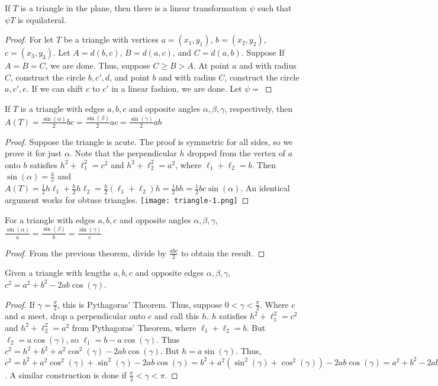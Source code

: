 \documentclass[crop=false,class=book]{standalone}
\begin{document}
\begin{theorem}
If $T$ is a triangle in the plane, then there is a linear transformation $\psi$ such that $\psi T$ is equilateral.
\end{theorem}
\begin{proof}
For let $T$ be a triangle with vertices $a=(x_1,y_1)$, $b=(x_2,y_2)$, $c=(x_3,y_3)$. Let $A = d(b,c)$, $B=d(a,c)$, and $C=d(a,b)$. Suppose If $A=B=C$, we are done. Thus, suppose $C\geq B >A$. At point $a$ and with radius $C$, construct the circle $b,c',d$, and point $b$ and with radius $C$, construct the circle $a,c',e$. If we can shift $c$ to $c'$ in a linear fashion, we are done. Let $\psi =$
\end{proof}
\begin{theorem}
If $T$ is a triangle with edges $a,b,c$ and opposite angles $\alpha,\beta,\gamma$, respectively, then $A(T) = \frac{\sin(\alpha)}{2}bc = \frac{\sin(\beta)}{2}ac = \frac{\sin(\gamma)}{2}ab$
\end{theorem}
\begin{proof}
Suppose the triangle is acute. The proof is symmetric for all sides, so we prove it for just $\alpha$. Note that the perpendicular $h$ dropped from the vertex of $a$ onto $b$ satisfies $h^2+\ell_1^2 = c^2$ and $h^2+\ell_2^2 = a^2$, where $\ell_1+\ell_2 = b$. Then $\sin(\alpha) = \frac{h}{c}$ and $A(T) = \frac{1}{2}h\ell_1 + \frac{h}{2}h\ell_2 = \frac{h}{2}(\ell_1+\ell_2)h = \frac{1}{2}bh = \frac{1}{2}bc\sin(\alpha)$. An identical argument works for obtuse triangles.
\texttt{[image: triangle-1.png]}
\end{proof}
\begin{corollary}
For a triangle with edges $a,b,c$ and opposite angles $\alpha,\beta,\gamma$, $\frac{\sin(\alpha)}{a} = \frac{\sin(\beta)}{b} = \frac{\sin(\gamma)}{c}$
\end{corollary}
\begin{proof}
From the previous theorem, divide by $\frac{abc}{2}$ to obtain the result.
\end{proof}
\begin{theorem}
Given a triangle with lengths $a,b,c$ and opposite edges $\alpha,\beta,\gamma$, $c^2=a^2+b^2-2ab\cos(\gamma)$.
\end{theorem}
\begin{proof}
If $\gamma=\frac{\pi}{2}$, this is Pythagoras' Theorem. Thus, suppose $0<\gamma < \frac{\pi}{2}$. Where $c$ and $a$ meet, drop a perpendicular onto $c$ and call this $h$. $h$ satisfies $h^2+\ell_1^2 = c^2$ and $h^2+\ell_2^2=a^2$ from Pythagoras' Theorem, where $\ell_1+\ell_2 = b$. But $\ell_2 = a\cos(\gamma)$, so $\ell_1 = b-a\cos(\gamma)$. Thus $c^2 = h^2 + b^2 +a^2\cos^2(\gamma)-2ab\cos(\gamma)$. But $h = a\sin(\gamma)$. Thus, $c^2 = b^2 + a^2 \cos^2(\gamma)+\sin^2(\gamma)-2ab\cos(\gamma) = b^2 + a^2(\sin^2(\gamma)+\cos^2(\gamma))-2ab\cos(\gamma) = a^2 + b^2 -2ab\cos(\gamma)$. A similar construction is done if $\frac{\pi}{2}<\gamma < \pi$.
\end{proof}
\end{document}
